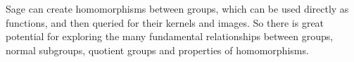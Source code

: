 Sage can create homomorphisms between groups, which can be used directly as functions, and then queried for their kernels and images.  So there is great potential for exploring the many fundamental relationships between groups, normal subgroups, quotient groups and properties of homomorphisms.